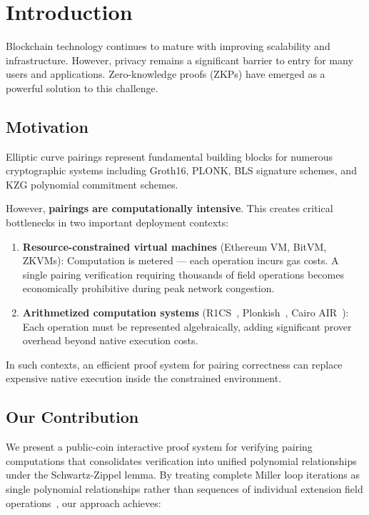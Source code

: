 \section{Introduction}

Blockchain technology continues to mature with improving scalability and infrastructure. However, privacy remains a significant barrier to entry for many users and applications. Zero-knowledge proofs (ZKPs) have emerged as a powerful solution to this challenge.

\subsection{Motivation}

Elliptic curve pairings represent fundamental building blocks for numerous cryptographic systems including Groth16\cite{Gro16}, PLONK\cite{plnk19}, BLS signature schemes\cite{bls05}, and KZG polynomial commitment schemes\cite{kzg10}.

However, \textbf{pairings are computationally intensive}. This creates critical bottlenecks in two important deployment contexts:

\begin{enumerate}
\item \textbf{Resource-constrained virtual machines} (Ethereum VM, BitVM, ZKVMs): Computation is metered — each operation incurs gas costs. A single pairing verification requiring thousands of field operations becomes economically prohibitive during peak network congestion.

\item \textbf{Arithmetized computation systems} (R1CS~\cite{r1cs13}, Plonkish~\cite{plnk19}, Cairo AIR~\cite{cairo21}): Each operation must be represented algebraically, adding significant prover overhead beyond native execution costs.
\end{enumerate}

In such contexts, an efficient proof system for pairing correctness can replace expensive native execution inside the constrained environment.

\subsection{Our Contribution}

We present a public-coin interactive proof system for verifying pairing computations that consolidates verification into unified polynomial relationships under the Schwartz-Zippel lemma. By treating complete Miller loop iterations as single polynomial relationships rather than sequences of individual extension field operations~\cite{FXFM23}, our approach achieves:

